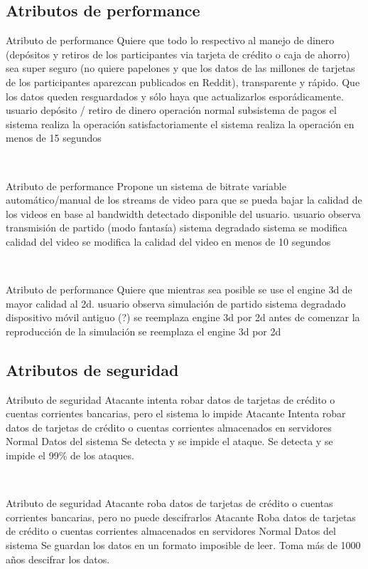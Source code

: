 \subsection{Atributos de performance}

\escenario
{Atributo de performance}
{Quiere que todo lo respectivo al manejo de dinero (depósitos y retiros de los participantes
via tarjeta de crédito o caja de ahorro) sea super seguro (no quiere papelones y que los
datos de las millones de tarjetas de los participantes aparezcan publicados en Reddit),
transparente y rápido. Que los datos queden resguardados y sólo haya que actualizarlos
esporádicamente.}
{usuario}
{depósito / retiro de dinero}
{operación normal}
{subsistema de pagos}
{el sistema realiza la operación satisfactoriamente}
{el sistema realiza la operación en menos de 15 segundos}

~

\escenario
{Atributo de performance}
{Propone un sistema de bitrate variable automático/manual de los streams de video para
que se pueda bajar la calidad de los videos en base al bandwidth detectado disponible del
usuario.}
{usuario}
{observa transmisión de partido (modo fantasía)}
{sistema degradado}
{sistema}
{se modifica calidad del video}
{se modifica la calidad del video en menos de 10 segundos}

~

\escenario
{Atributo de performance}
{Quiere que mientras sea posible se use el engine 3d de mayor calidad al 2d.}
{usuario}
{observa simulación de partido}
{sistema degradado}
{dispositivo móvil antiguo (?)}
{se reemplaza engine 3d por 2d}
{antes de comenzar la reproducción de la simulación se reemplaza el engine 3d por 2d}

\subsection{Atributos de seguridad}

\escenario
{Atributo de seguridad}
{Atacante intenta robar datos de tarjetas de crédito o cuentas corrientes bancarias, pero el sistema lo impide}
{Atacante}
{Intenta robar datos de tarjetas de crédito o cuentas corrientes almacenados en servidores}
{Normal}
{Datos del sistema}
{Se detecta y se impide el ataque.}
{Se detecta y se impide el 99\% de los ataques.}

~

\escenario
{Atributo de seguridad}
{Atacante roba datos de tarjetas de crédito o cuentas corrientes bancarias, pero no puede descifrarlos}
{Atacante}
{Roba datos de tarjetas de crédito o cuentas corrientes almacenados en servidores}
{Normal}
{Datos del sistema}
{Se guardan los datos en un formato imposible de leer.}
{Toma más de 1000 años descifrar los datos.}


